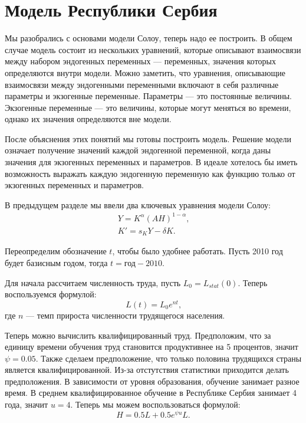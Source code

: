 \chapter{Модель Республики Сербия}
Мы разобрались с основами модели Солоу, теперь надо ее построить.
В общем случае модель состоит из нескольких уравнений, которые описывают взаимосвязи между набором эндогенных переменных --- переменных, значения которых определяются внутри модели.
Можно заметить, что уравнения, описывающие взаимосвязи между эндогенными переменными включают в себя различные параметры и экзогенные переменные.
Параметры --- это постоянные величины.
Экзогенные переменные --- это величины, которые могут меняться во времени, однако их значения определяются вне модели.

После объяснения этих понятий мы готовы построить модель.
Решение модели означает получение значений каждой эндогенной переменной, когда даны значения для экзогенных переменных и параметров.
В идеале хотелось бы иметь возможность выражать каждую эндогенную переменную как функцию только от экзогенных переменных и параметров.

В предыдущем разделе мы ввели два ключевых уравнения модели Солоу:
\begin{align*}
	Y=K^{\alpha}(AH)^{1-\alpha}\text{,}\\
	K'=s_{K}Y - \delta K \text{.}
\end{align*}

Переопределим обозначение $t$, чтобы было удобнее работать.
Пусть 2010 год будет базисным годом, тогда $t = \text{год} - 2010$.

Для начала рассчитаем численность труда, пусть $L_0 = L_{stat}(0)$.
Теперь воспользуемся формулой:
\begin{equation*}
	L(t) = L_0 e^{nt}\text{,}
\end{equation*}
где $n$ --- темп прироста численности трудящегося населения.

Теперь можно вычислить квалифицированный труд.
Предположим, что за единицу времени обучения труд становится продуктивнее на 5 процентов, значит $\psi= 0.05$.
Также сделаем предположение, что только половина трудящихся страны является квалифицированной.
Из-за отстутствия статистики приходится делать предположения.
В зависимости от уровня образования, обучение занимает разное время.
В среднем квалифицированное обучение в Республике Сербия занимает 4 года, значит $u = 4$.
Теперь мы можем воспользоваться формулой:
\begin{equation*}
H = 0.5L + 0.5 e^{\psi u}L\text{.}
\end{equation*}


